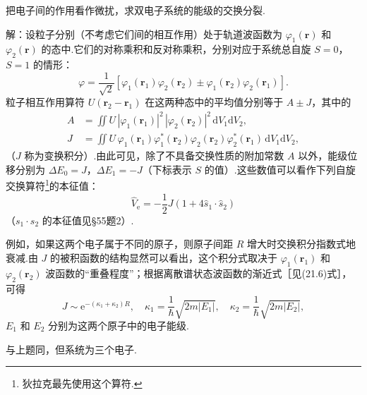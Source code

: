 \begin{xiti}

\quad 把电子间的作用看作微扰，求双电子系统的能级的交换分裂.

解：设粒子分别（不考虑它们间的相互作用）处于轨道波函数为 $\varphi_1(\boldsymbol{r})$ 和 $\varphi_2(\boldsymbol{r})$ 的态中.它们的对称乘积和反对称乘积，分别对应于系统总自旋 $S=0$，$S=1$ 的情形：
\begin{equation*}
  \varphi=\frac{1}{\sqrt{2}}\left[\varphi_1(\boldsymbol{r}_1)\varphi_2(\boldsymbol{r}_2)\pm\varphi_1(\boldsymbol{r}_2)\varphi_2(\boldsymbol{r}_1)\right].
\end{equation*}
粒子相互作用算符 $U(\boldsymbol{r}_2-\boldsymbol{r}_1)$ 在这两种态中的平均值分别等于 $A\pm J$，其中的
\begin{equation*}
\begin{aligned}
  A&=\iint U\,|\varphi_1(\boldsymbol{r}_1)|^2\,|\varphi_2(\boldsymbol{r}_2)|^2\,\mathrm{d}V_1\mathrm{d}V_2,\\
  J&=\iint U\,\varphi_1(\boldsymbol{r}_1)\varphi_1^{*}(\boldsymbol{r}_2)\varphi_2(\boldsymbol{r}_2)\varphi_2^{*}(\boldsymbol{r}_1)\,\mathrm{d}V_1\mathrm{d}V_2,
\end{aligned}
\end{equation*}
（$J$ 称为变换积分）.由此可见，除了不具备交换性质的附加常数 $A$ 以外，能级位移分别为 $\Delta E_0=J$，$\Delta E_1=-J$（下标表示 $S$ 的值）.这些数值可以看作下列自旋交换算符\footnote{狄拉克最先使用这个算符.}的本征值：
\setcounter{equation}{0}\renewcommand{\theequation}{\arabic{equation}}%
\begin{equation}
  \hat{V}_{\mathrm{e}}=-\frac{1}{2}J(1+4\hat{s}_1\cdot\hat{s}_2)
\end{equation}
（$s_1\cdot s_2$ 的本征值见§55题2）.

例如，如果这两个电子属于不同的原子，则原子间距 $R$ 增大时交换积分指数式地衰减.由 $J$ 的被积函数的结构显然可以看出，这个积分式取决于 $\varphi_1(\boldsymbol{r}_1)$ 和 $\varphi_2(\boldsymbol{r}_2)$ 波函数的“重叠程度”；根据离散谱状态波函数的渐近式［见(21.6)式］，可得
\begin{equation*}
  J\sim\mathrm{e}^{-(\kappa_1+\kappa_2)R},\quad
  \kappa_1=\frac{1}{\hbar}\sqrt{2m|E_1|},\quad
  \kappa_2=\frac{1}{\hbar}\sqrt{2m|E_2|},
\end{equation*}
$E_1$ 和 $E_2$ 分别为这两个原子中的电子能级.

\quad 与上题同，但系统为三个电子.


\end{xiti}
